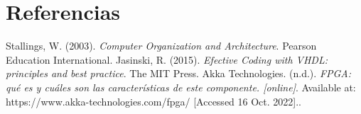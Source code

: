 \section{Referencias}
\begin{thebibliography}{0}
	Stallings, W. (2003). \textit{Computer Organization and Architecture}. Pearson Education International.
	Jasinski, R. (2015). \textit{Efective Coding with VHDL: principles and best practice}. The MIT Press.
	Akka Technologies. (n.d.). \textit{FPGA: qu\'e es y cu\'ales son las caracter\'isticas de este componente. [online]}. Available at: https://www.akka-technologies.com/fpga/ [Accessed 16 Oct. 2022]..
\end{thebibliography}
\printbibliography